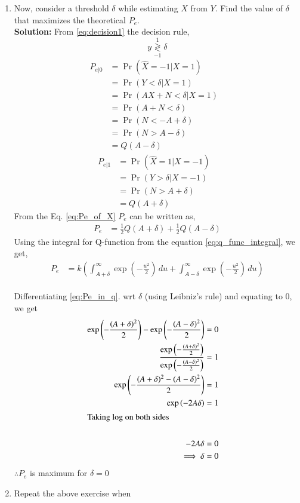 \documentclass[journal,10pt,twocolumn]{IEEEtran}
\newcounter{Chapcounter}
\numberwithin{equation}{subsection}
\numberwithin{figure}{subsection}
\renewcommand\thesection{\theChapcounter.\arabic{section}}
\providecommand{\pr}[1]{\ensuremath{\Pr\left(#1\right)}}
\newcommand{\solution}{\noindent \textbf{Solution: }}
\providecommand{\dec}[2]{\ensuremath{\overset{#1}{\underset{#2}{\gtrless}}}}
\renewcommand\thesection{\arabic{section}}
\renewcommand\thesubsection{\thesection.\arabic{subsection}}
\begin{document}
\begin{enumerate}[label=\thesubsection.\arabic*,ref=\thesubsection.\arabic{figure}]
\item Now, consider a threshold $\delta$  while estimating $X$ from $Y$. Find the value of $\delta$ that maximizes the theoretical $P_e$.\\
\solution From \ref{eq:decision1} the decision rule, 
\begin{equation}
y \dec{1}{-1} \delta
\end{equation}
\begin{align*}
	P_{e|0} &= \pr{\hat{X} = -1|X=1}&\\
	&= \pr{Y < \delta|X=1}&\\
	&= \pr{AX + N < \delta|X=1}&\\ 
	&= \pr{A + N < \delta}&\\
	&= \pr{N < -A + \delta}&\\
	&= \pr{N > A - \delta}&\\
	&= Q(A-\delta)
\end{align*}
\begin{align*}
	P_{e|1} &= \pr{\hat{X} = 1|X=-1}&\\
	&= \pr{Y > \delta|X=-1}&\\
	&= \pr{N > A + \delta}&\\
	&= Q(A+\delta)
\end{align*}
From the Eq. \ref{eq:Pe_of_X} $P_e$ can be written as,
\begin{align}
	P_e &= \frac{1}{2}Q(A+\delta) + \frac{1}{2}Q(A-\delta)
\end{align}
Using the integral for Q-function from the equation \ref{eq:q_func_integral}, we get,
\begin{align}
	P_e &= k(\int_{A+\delta}^\infty \exp\left(-\frac{u^2}{2}\right) \, du + \int_{A-\delta}^\infty \exp\left(-\frac{u^2}{2}\right) \, du)
	\label{eq:Pe_in_q}
	\end{align}
		\\
Differentiating \ref{eq:Pe_in_q}. wrt $\delta$ (using Leibniz's rule) and equating to $0$, we get
\begin{align}
	\exp\left(-\frac{(A+\delta)^2}{2}\right)-\exp\left(-\frac{(A-\delta)^2}{2}\right) &= 0&\\
	\frac{\exp\left(-\frac{(A+\delta)^2}{2}\right)}{\exp\left(-\frac{(A-\delta)^2}{2}\right)} &= 1&\\
	\exp\left(-\frac{(A+\delta)^2-(A-\delta)^2}{2}\right) &= 1&\\
	\exp\left(-2A\delta\right) &= 1&\\
	\intertext{Taking $\log$ on both sides}\\
	-2A\delta &= 0&\\
	\implies \delta &= 0
\end{align}
$\therefore P_e$ is maximum for $\delta = 0$
\item Repeat the above exercise when 


\end{enumerate}
\end{document}
